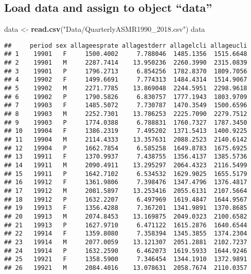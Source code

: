 \documentclass[]{article}
\newenvironment{Shaded}{\begin{snugshade}}{\end{snugshade}}
\newcommand{\KeywordTok}[1]{\textcolor[rgb]{0.13,0.29,0.53}{\textbf{#1}}}
\newcommand{\StringTok}[1]{\textcolor[rgb]{0.31,0.60,0.02}{#1}}
\newcommand{\NormalTok}[1]{#1}
\begin{document}
\subsection{\texorpdfstring{Load data and assign to object
``data''}{Load data and assign to object data}}\label{load-data-and-assign-to-object-data}

\begin{Shaded}
\begin{Highlighting}[]
\NormalTok{data <-}\StringTok{ }\KeywordTok{read.csv}\NormalTok{(}\StringTok{"Data/QuarterlyASMR1990_2018.csv"}\NormalTok{)}
\NormalTok{data}
\end{Highlighting}
\end{Shaded}

\begin{verbatim}
##     period sex allageesprate allagestderr allagelcli allageucli
## 1    19901   F     1500.4002     7.788046  1485.1356  1515.6648
## 2    19901   M     2287.7414    13.950236  2260.3990  2315.0839
## 3    19901   P     1796.2713     6.854256  1782.8370  1809.7056
## 4    19902   F     1499.6691     7.774313  1484.4314  1514.9067
## 5    19902   M     2271.7785    13.869048  2244.5951  2298.9618
## 6    19902   P     1790.5826     6.830757  1777.1943  1803.9709
## 7    19903   F     1485.5072     7.730787  1470.3549  1500.6596
## 8    19903   M     2252.7301    13.786253  2225.7090  2279.7512
## 9    19903   P     1774.0388     6.788831  1760.7327  1787.3450
## 10   19904   F     1386.2319     7.495202  1371.5413  1400.9225
## 11   19904   M     2114.4333    13.357631  2088.2523  2140.6142
## 12   19904   P     1662.7854     6.585258  1649.8783  1675.6925
## 13   19911   F     1370.9937     7.438755  1356.4137  1385.5736
## 14   19911   M     2090.4911    13.295297  2064.4323  2116.5499
## 15   19911   P     1642.7102     6.534532  1629.9025  1655.5179
## 16   19912   F     1361.9806     7.398476  1347.4796  1376.4817
## 17   19912   M     2081.5897    13.253416  2055.6131  2107.5664
## 18   19912   P     1632.2207     6.497969  1619.4847  1644.9567
## 19   19913   F     1356.4288     7.367201  1341.9891  1370.8685
## 20   19913   M     2074.8453    13.169875  2049.0323  2100.6582
## 21   19913   P     1627.9710     6.471122  1615.2876  1640.6544
## 22   19914   F     1359.8080     7.358394  1345.3855  1374.2304
## 23   19914   M     2077.0059    13.121307  2051.2881  2102.7237
## 24   19914   P     1632.2590     6.462073  1619.5933  1644.9246
## 25   19921   F     1358.5900     7.346454  1344.1910  1372.9891
## 26   19921   M     2084.4016    13.078631  2058.7674  2110.0357

\end{verbatim}
\end{document}
